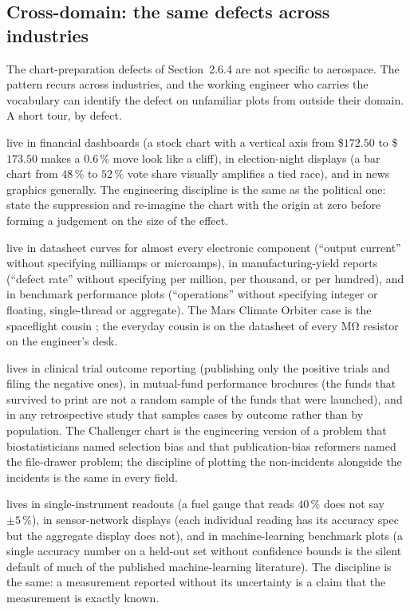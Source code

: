 \subsection{Cross-domain: the same defects across industries}

The chart-preparation defects of Section~2.6.4 are not specific to
aerospace. The pattern recurs across industries, and the working
engineer who carries the vocabulary can identify the defect on
unfamiliar plots from outside their domain. A short tour, by
defect.

 live in financial dashboards (a stock
chart with a vertical axis from \$$172.50$ to \$$173.50$ makes a
$0.6\,\%$ move look like a cliff), in election-night displays (a
bar chart from $48\,\%$ to $52\,\%$ vote share visually amplifies
a tied race), and in news graphics generally. The engineering
discipline is the same as the political one: state the suppression
and re-imagine the chart with the origin at zero before forming a
judgement on the size of the effect.

 live in datasheet curves
for almost every electronic component (``output current'' without
specifying milliamps or microamps), in manufacturing-yield reports
(``defect rate'' without specifying per million, per thousand, or
per hundred), and in benchmark performance plots (``operations''
without specifying integer or floating, single-thread or aggregate).
The Mars Climate Orbiter case is the spaceflight cousin
\cite{acc:nasa-mco-mib}; the everyday cousin is on the datasheet
of every $\si{\mega\ohm}$ resistor on the engineer's desk.

 lives in clinical
trial outcome reporting (publishing only the positive trials and
filing the negative ones), in mutual-fund performance brochures
(the funds that survived to print are not a random sample of the
funds that were launched), and in any retrospective study that
samples cases by outcome rather than by population. The Challenger
chart is the engineering version of a problem that biostatisticians
named selection bias and that publication-bias reformers named
the file-drawer problem; the discipline of plotting the
non-incidents alongside the incidents is the same in every field.

 lives in single-instrument readouts
(a fuel gauge that reads $40\,\%$ does not say $\pm 5\,\%$), in
sensor-network displays (each individual reading has its accuracy
spec but the aggregate display does not), and in machine-learning
benchmark plots (a single accuracy number on a held-out set
without confidence bounds is the silent default of much of the
published machine-learning literature). The discipline is the
same: a measurement reported without its uncertainty is a claim
that the measurement is exactly known.

